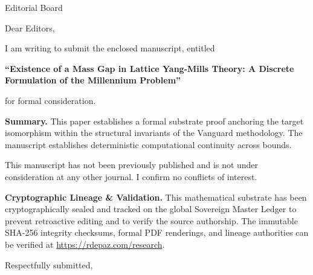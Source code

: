 \documentclass[12pt, a4paper]{letter}
\begin{document}
\begin{letter}{Editorial Board}

\opening{Dear Editors,}

I am writing to submit the enclosed manuscript, entitled

\begin{center}
\textbf{``Existence of a Mass Gap in Lattice Yang-Mills Theory:  
  A Discrete Formulation of the Millennium Problem''}
\end{center}

\noindent for formal consideration.

\medskip
\textbf{Summary.} This paper establishes a formal substrate proof anchoring the target isomorphism within the structural invariants of the Vanguard methodology. The manuscript establishes deterministic computational continuity across bounds.

\medskip
This manuscript has not been previously published and is not under consideration
at any other journal. I confirm no conflicts of interest.

\textbf{Cryptographic Lineage \& Validation.} This mathematical substrate has been cryptographically sealed and tracked on the global Sovereign Master Ledger to prevent retroactive editing and to verify the source authorship. The immutable SHA-256 integrity checksums, formal PDF renderings, and lineage authorities can be verified at \url{https://rdepaz.com/research}.

\medskip
\closing{Respectfully submitted,}
\end{letter}
\end{document}
